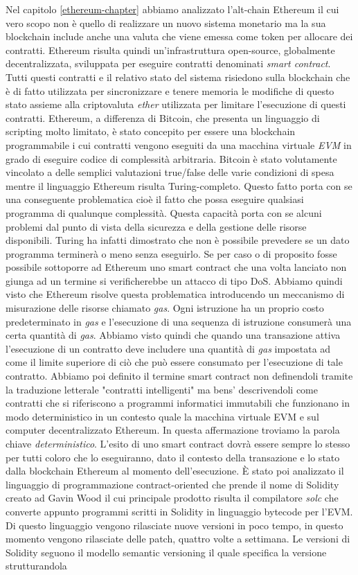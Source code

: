 Nel capitolo \ref{ethereum-chapter} abbiamo analizzato l'alt-chain Ethereum il cui vero scopo non è quello di realizzare un nuovo sistema monetario ma la sua blockchain include anche una valuta che viene emessa come token per allocare dei contratti. Ethereum risulta quindi un'infrastruttura open-source, globalmente decentralizzata, sviluppata per eseguire contratti denominati \textit{smart contract}. Tutti questi contratti e il relativo stato del sistema risiedono sulla blockchain che è di fatto utilizzata per sincronizzare e tenere memoria le modifiche di questo stato assieme alla criptovaluta \textit{ether} utilizzata per limitare l'esecuzione di questi contratti. Ethereum, a differenza di Bitcoin, che presenta un linguaggio di scripting molto limitato, è stato concepito per essere una blockchain programmabile i cui contratti vengono eseguiti da una macchina virtuale \textit{EVM} in grado di eseguire codice di complessità arbitraria. Bitcoin è stato volutamente vincolato a delle semplici valutazioni true/false delle varie condizioni di spesa mentre il linguaggio Ethereum risulta Turing-completo. Questo fatto porta con se una conseguente problematica cioè il fatto che possa eseguire qualsiasi programma di qualunque complessità. Questa capacità porta con se alcuni problemi dal punto di vista della sicurezza e della gestione delle risorse disponibili. Turing ha infatti dimostrato che non è possibile prevedere se un dato programma terminerà o meno senza eseguirlo. Se per caso o di proposito fosse possibile sottoporre ad Ethereum uno smart contract che una volta lanciato non giunga ad un termine si verificherebbe un attacco di tipo DoS. Abbiamo quindi visto che Ethereum risolve questa problematica introducendo un meccanismo di misurazione delle risorse chiamato \textit{gas}. Ogni istruzione ha un proprio costo predeterminato in \textit{gas} e l'esecuzione di una sequenza di istruzione consumerà una certa quantità di \textit{gas}. Abbiamo visto quindi che quando una transazione attiva l'esecuzione di un contratto deve includere una quantità di \textit{gas} impostata ad come il limite superiore di ciò che può essere consumato per l'esecuzione di tale contratto. Abbiamo poi definito il termine smart contract non definendoli tramite la traduzione letterale "contratti intelligenti" ma bens' descrivendoli come contratti che si riferiscono a programmi informatici immutabili che funzionano in modo deterministico in un contesto quale la macchina virtuale EVM e sul computer decentralizzato Ethereum. In questa affermazione troviamo la parola chiave \textit{deterministico}. L'esito di uno smart contract dovrà essere sempre lo stesso per tutti coloro che lo eseguiranno, dato il contesto della transazione e lo stato dalla blockchain Ethereum al momento dell'esecuzione. \`E stato poi analizzato il linguaggio di programmazione contract-oriented che prende il nome di Solidity creato ad Gavin Wood il cui principale prodotto risulta il compilatore \textit{solc} che converte appunto programmi scritti in Solidity in linguaggio bytecode per l'EVM. Di questo linguaggio vengono rilasciate nuove versioni in poco tempo, in questo momento vengono rilasciate delle patch, quattro volte a settimana. Le versioni di Solidity seguono il modello semantic versioning il quale specifica la versione strutturandola 